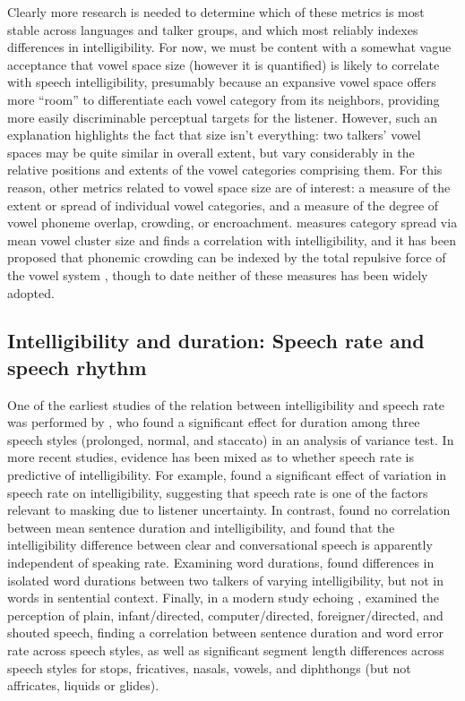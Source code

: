 Clearly more research is needed to determine which of these metrics is most stable across languages and talker groups, and which most reliably indexes differences in intelligibility.  For now, we must be content with a somewhat vague acceptance that vowel space size (however it is quantified) is likely to correlate with speech intelligibility, presumably because an expansive vowel space offers more “room” to differentiate each vowel category from its neighbors, providing more easily discriminable perceptual targets for the listener.  However, such an explanation highlights the fact that size isn’t everything: two talkers’ vowel spaces may be quite similar in overall extent, but vary considerably in the relative positions and extents of the vowel categories comprising them.  For this reason, other metrics related to vowel space size are of interest: a measure of the extent or spread of individual vowel categories, and a measure of the degree of vowel phoneme overlap, crowding, or encroachment.  \citet{McCloyEtAl2013} measures category spread via mean vowel cluster size and finds a correlation with intelligibility, and it has been proposed that phonemic crowding can be indexed by the total repulsive force of the vowel system \citep[see][]{Wright2004a, McCloyEtAl2013}, though to date neither of these measures has been widely adopted.


\subsection[Intelligibility and duration]{Intelligibility and duration: Speech rate and speech rhythm\label{sec:IntelDur}}
One of the earliest studies of the relation between intelligibility and speech rate was performed by \citet{Tolhurst1957a}, who found a significant effect for duration among three speech styles (prolonged, normal, and staccato) in an analysis of variance test.  In more recent studies, evidence has been mixed as to whether speech rate is predictive of intelligibility.  For example, \citet{SommersEtAl1994} found a significant effect of variation in speech rate on intelligibility, suggesting that speech rate is one of the factors relevant to masking due to listener uncertainty.  In contrast, \citet{BradlowEtAl1996} found no correlation between mean sentence duration and intelligibility, and \citet{KrauseBraida2002} found that the intelligibility difference between clear and conversational speech is apparently independent of speaking rate.\footnotemark{}  Examining word durations, \citet{BondMoore1994} found differences in isolated word durations between two talkers of varying intelligibility, but not in words in sentential context.  Finally, in a modern study echoing \citet{Tolhurst1957a}, \citet{MayoEtAl2012} examined the perception of plain, infant\-/directed, computer\-/directed, foreigner\-/directed, and shouted speech, finding a correlation between sentence duration and word error rate across speech styles, as well as significant segment length differences across speech styles for stops, fricatives, nasals, vowels, and diphthongs (but not affricates, liquids or glides).  


